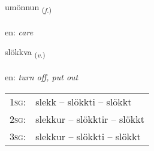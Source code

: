 \documentclass[frontgrid, backgrid]{flacards}\usepackage[]{graphicx}\usepackage[]{xcolor}
\begin{document}
\renewcommand{\flhead}{\vskip5pt \fboxsep=0pt {\small\bfseries\footnotesize Nafnorð | Noun}}
\renewcommand{\fcfoot}{\vskip5pt \fboxsep=0pt \hspace{2pt}{\small\bfseries\footnotesize 3K}}

\renewcommand{\blhead}{\vskip5pt {\small\bfseries\footnotesize Nafnorð | Noun }}
\renewcommand{\bcfoot}{\vskip5pt \hspace{2pt}{\small\bfseries\footnotesize 3K}}


{umönnun \small{\textsubscript{(\textit{f.})}} \\[1ex] %
\textphonetic{[ʏmœnʏn]} \\
en: \emph{care} \\  [2ex]
\renewcommand*{\arraystretch}{0.8}
}

\renewcommand{\flhead}{\vskip5pt \fboxsep=0pt {\small\bfseries\footnotesize Sagnorð | Verb}}
\renewcommand{\fcfoot}{\vskip5pt \fboxsep=0pt \hspace{2pt}{\small\bfseries\footnotesize 3K}}

\renewcommand{\blhead}{\vskip5pt {\small\bfseries\footnotesize Sagnorð | Verb }}
\renewcommand{\bcfoot}{\vskip5pt \hspace{2pt}{\small\bfseries\footnotesize 3K}}


{slökkva \small{\textsubscript{(\textit{v.})}} \\[1ex] %
\textphonetic{[stlœhkva]} \\
en: \emph{turn off, put out} \\  [2ex]
\renewcommand*{\arraystretch}{0.8}
\begin{tabular}{p{1cm}l}
\textsc{1sg}: & slekk -- slökkti -- slökkt \\ 
\textsc{2sg}: & slekkur -- slökktir -- slökkt \\ 
\textsc{3sg}: & slekkur -- slökkti -- slökkt \\ 
\end{tabular}
}
\end{document}
